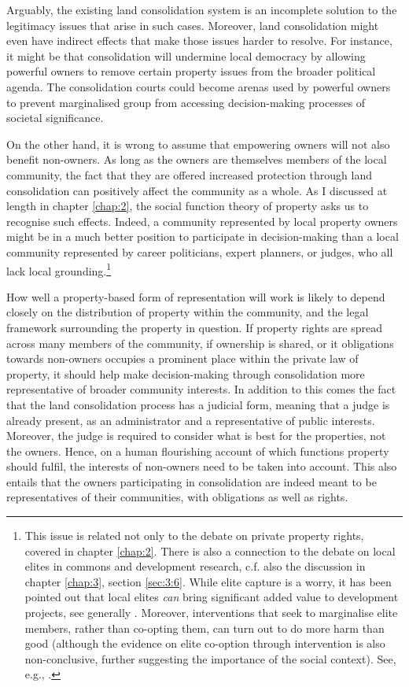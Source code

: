 Arguably, the existing land consolidation system is an incomplete solution to the legitimacy issues that arise in such cases. Moreover, land consolidation might even have indirect effects that make those issues harder to resolve. For instance, it might be that consolidation will undermine local democracy by allowing powerful owners to remove certain property issues from the broader political agenda. The consolidation courts could become arenas used by powerful owners to prevent marginalised group from accessing decision-making processes of societal significance.

On the other hand, it is wrong to assume that empowering owners will not also benefit non-owners. As long as the owners are themselves members of the local community, the fact that they are offered increased protection through land consolidation can positively affect the community as a whole. As I discussed at length in chapter \ref{chap:2}, the social function theory of property asks us to recognise such effects. Indeed, a community represented by local property owners might be in a much better position to participate in decision-making than a local community represented by career politicians, expert planners, or judges, who all lack local grounding.\footnote{This issue is related not only to the debate on private property rights, covered in chapter \ref{chap:2}. There is also a connection to the debate on local elites in commons and development research, c.f. also the discussion in chapter \ref{chap:3}, section \ref{sec:3:6}. While elite capture is a worry, it has been pointed out that local elites {\it can} bring significant added value to development projects, see generally \cite{amsden12}. Moreover, interventions that seek to marginalise elite members, rather than co-opting them, can turn out to do more harm than good (although the evidence on elite co-option through intervention is also non-conclusive, further suggesting the importance of the social context). See, e.g., \cite{wong13,arnall13}.}

How well a property-based form of representation will work is likely to depend closely on the distribution of property within the community, and the legal framework surrounding the property in question. If property rights are spread across many members of the community, if ownership is shared, or it obligations towards non-owners occupies a prominent place within the private law of property, it should help make decision-making through consolidation more representative of broader community interests. In addition to this comes the fact that the land consolidation process has a judicial form, meaning that a judge is already present, as an administrator and a representative of public interests. Moreover, the judge is required to consider what is best for the properties, not the owners. Hence, on a human flourishing account of which functions property should fulfil, the interests of non-owners need to be taken into account. This also entails that the owners participating in consolidation are indeed meant to be representatives of their communities, with obligations as well as rights.

